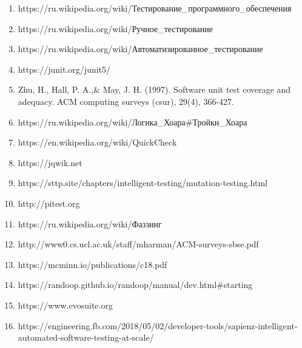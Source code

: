 \begin{enumerate}

\item https://ru.wikipedia.org/wiki/Тестирование\_программного\_обеспечения
	
\item https://ru.wikipedia.org/wiki/Ручное\_тестирование

\item https://ru.wikipedia.org/wiki/Автоматизированное\_тестирование

\item https://junit.org/junit5/

\item Zhu, H., Hall, P. A.,\& May, J. H. (1997). Software unit test coverage and adequacy. ACM computing surveys (csur), 29(4), 366-427.

\item https://ru.wikipedia.org/wiki/Логика\_Хоара#Тройки\_Хоара

\item https://en.wikipedia.org/wiki/QuickCheck

\item https://jqwik.net

\item https://sttp.site/chapters/intelligent-testing/mutation-testing.html

\item http://pitest.org

\item https://ru.wikipedia.org/wiki/Фаззинг

\item http://www0.cs.ucl.ac.uk/staff/mharman/ACM-surveys-sbse.pdf

\item https://mcminn.io/publications/c18.pdf

\item https://randoop.github.io/randoop/manual/dev.html#starting

\item https://www.evosuite.org

\item https://engineering.fb.com/2018/05/02/developer-tools/sapienz-intelligent-automated-software-testing-at-scale/

\end{enumerate}


